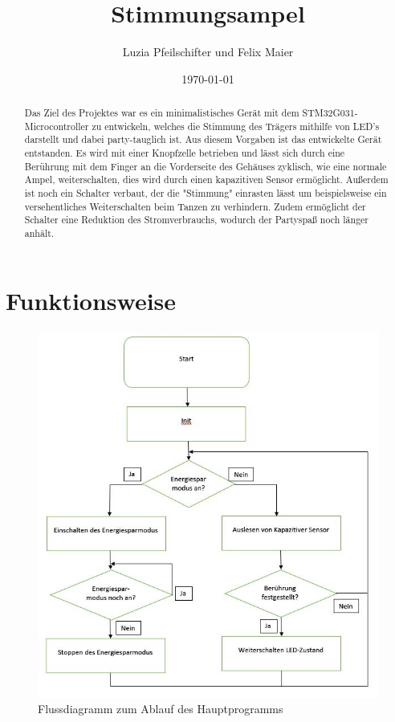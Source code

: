 \documentclass[a4paper,
DIV=13,
12pt,
BCOR=10mm,
department=FakEI,
parskip=half,
automark,
]{article}
\date{\today}
\title{Stimmungsampel}
\author{Luzia Pfeilschifter und Felix Maier}
\begin{document}
\maketitle
\cleardoublepage
\begin{abstract}
Das Ziel des Projektes war es ein minimalistisches Gerät mit dem STM32G031-Microcontroller zu entwickeln, welches die Stimmung des Trägers mithilfe von LED's darstellt und dabei party-tauglich ist. Aus diesem Vorgaben ist das entwickelte Gerät entstanden. Es wird mit einer Knopfzelle betrieben und lässt sich durch eine Berührung mit dem Finger an die Vorderseite des Gehäuses zyklisch, wie eine normale Ampel, weiterschalten, dies wird durch einen kapazitiven Sensor ermöglicht. Außerdem ist noch ein Schalter verbaut, der die "Stimmung" einrasten lässt um beispielsweise ein versehentliches Weiterschalten beim Tanzen zu verhindern. Zudem ermöglicht der Schalter eine Reduktion des Stromverbrauchs, wodurch der Partyspaß noch länger anhält.
\end{abstract}
\cleardoublepage
\tableofcontents

\cleardoublepage
\section{Funktionsweise}
\begin{figure}[!hbpt]
 \begin{center} \includegraphics[width=1.2\textwidth]{AblaufMain.jpg}
 \caption{Flussdiagramm zum Ablauf des Hauptprogramms}
 \label{fig:Register}
  \end{center}
\end{figure}
\end{document}
